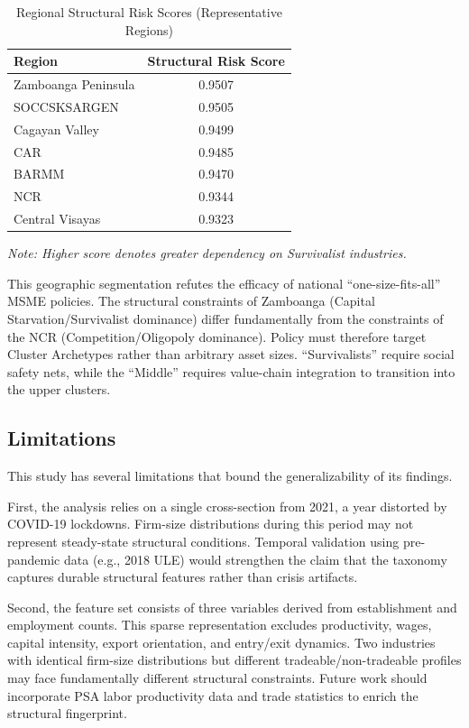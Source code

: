 \documentclass[acmtog, nonacm]{acmart}
\begin{document}
\begin{table}[ht]
  \caption{Regional Structural Risk Scores (Representative Regions)}
  \label{tab:regional_risk}
  \begin{tabularx}{\linewidth}{X c}
    \toprule
    \textbf{Region} & \textbf{Structural Risk Score} \\
    \midrule
    Zamboanga Peninsula & 0.9507 \\
    SOCCSKSARGEN & 0.9505 \\
    Cagayan Valley & 0.9499 \\
    CAR & 0.9485 \\
    BARMM & 0.9470 \\
    NCR & 0.9344 \\
    Central Visayas & 0.9323 \\
    \bottomrule
  \end{tabularx}
  \small \textit{Note: Higher score denotes greater dependency on Survivalist industries.}
\end{table}

This geographic segmentation refutes the efficacy of national ``one-size-fits-all'' MSME policies. The structural constraints of Zamboanga (Capital Starvation/Survivalist dominance) differ fundamentally from the constraints of the NCR (Competition/Oligopoly dominance). Policy must therefore target Cluster Archetypes rather than arbitrary asset sizes. ``Survivalists'' require social safety nets, while the ``Middle'' requires value-chain integration to transition into the upper clusters.

\subsection{Limitations}
This study has several limitations that bound the generalizability of its findings.

First, the analysis relies on a single cross-section from 2021, a year distorted by COVID-19 lockdowns. Firm-size distributions during this period may not represent steady-state structural conditions. Temporal validation using pre-pandemic data (e.g., 2018 ULE) would strengthen the claim that the taxonomy captures durable structural features rather than crisis artifacts.

Second, the feature set consists of three variables derived from establishment and employment counts. This sparse representation excludes productivity, wages, capital intensity, export orientation, and entry/exit dynamics. Two industries with identical firm-size distributions but different tradeable/non-tradeable profiles may face fundamentally different structural constraints. Future work should incorporate PSA labor productivity data and trade statistics to enrich the structural fingerprint.
\end{document}
